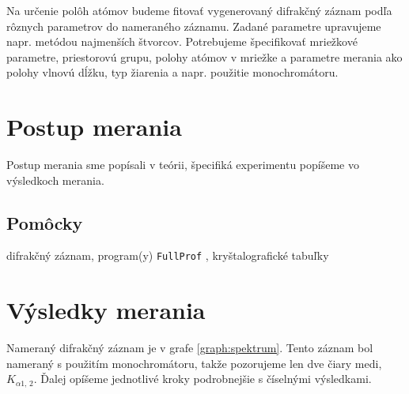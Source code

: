 \documentclass[a4paper, 10pt]{article}
\begin{document}
Na určenie polôh atómov budeme fitovať vygenerovaný difrakčný záznam podľa rôznych parametrov do nameraného záznamu. Zadané parametre upravujeme napr. metódou najmenších štvorcov. Potrebujeme špecifikovať mriežkové parametre, priestorovú grupu, polohy atómov v mriežke a parametre merania ako polohy vlnovú dĺžku, typ žiarenia a napr. použitie monochromátoru.

\section*{Postup merania}
Postup merania sme popísali v teórii, špecifiká experimentu popíšeme vo výsledkoch merania.
\subsection*{Pomôcky} difrakčný záznam, program(y) \texttt{FullProf} , kryštalografické tabuľky
\section*{Výsledky merania}
Nameraný difrakčný záznam je v grafe \ref{graph:spektrum}. Tento záznam bol nameraný s použitím monochromátoru, takže pozorujeme len dve čiary medi, $K_{\alpha 1,\, 2}$. Ďalej opíšeme jednotlivé kroky podrobnejšie s číselnými výsledkami.
\end{document}
